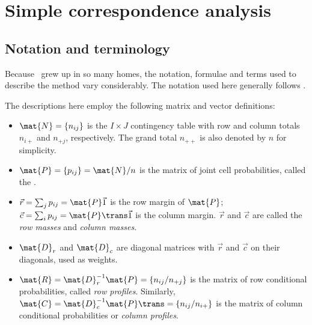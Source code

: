 \documentclass[11pt]{book}
\begin{document}
\section{Simple correspondence analysis}\label{sec:ca-simple}

\subsection{Notation and terminology}\label{sec:ca-notation}
Because \CA\ grew up in so many homes, the notation, formulae
and terms used to describe the method vary considerably.
The notation used here generally follows \citet{Greenacre:84,Greenacre:97,Greenacre:2007}.

The descriptions here employ the following matrix and vector definitions:
\begin{itemize}
\item $\mat{N} = \{ n_{ij} \}$ is the $I \times J$ contingency table
with row and column totals $n_{i+}$ and $n_{+j}$, respectively.
The grand total $n_{++}$ is also denoted by $n$ for simplicity.
\item $\mat{P} = \{ p_{ij} \} = \mat{N}/n$ is the matrix of joint cell
probabilities,  called the .
\item $\vec{r} = \sum_j p_{ij} = \mat{P} \vec{1}$ is the row margin of $\mat{P}$;
$\vec{c} = \sum_i p_{ij} = \mat{P}\trans \vec{1}$ is the column margin.
$\vec{r}$ and $\vec{c}$ are called the \emph{row masses} and \emph{column masses}.
\item $\mat{D}_r$ and $\mat{D}_c$ are diagonal matrices with $\vec{r}$
and $\vec{c}$ on their diagonals, used as weights.
\item $\mat{R} = \mat{D}_r^{-1} \mat{P} = \{ n_{ij} / n_{+j} \}$ is the matrix of
row conditional probabilities, called \emph{row profiles}.
Similarly, $\mat{C} = \mat{D}_c^{-1} \mat{P}\trans = \{ n_{ij} / n_{i+} \}$ is the matrix of
column conditional probabilities or \emph{column profiles}.
\end{itemize}
\end{document}
